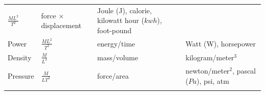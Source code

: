 \documentclass[
]{book}
\begin{document}
\begin{longtable}[]{@{}llll@{}}
\begin{minipage}[t]{0.17\columnwidth}
\(\frac{ML^2}{T^2}\)\strut
\end{minipage} & \begin{minipage}[t]{0.23\columnwidth}\raggedright
force \(\times\) displacement\strut
\end{minipage} & \begin{minipage}[t]{0.28\columnwidth}\raggedright
Joule (J), calorie, kilowatt hour (\(kwh\)), foot-pound\strut
\end{minipage}\tabularnewline
\begin{minipage}[t]{0.21\columnwidth}\raggedright
Power\strut
\end{minipage} & \begin{minipage}[t]{0.17\columnwidth}\raggedright
\(\frac{ML^2}{T^3}\)\strut
\end{minipage} & \begin{minipage}[t]{0.23\columnwidth}\raggedright
energy/time\strut
\end{minipage} & \begin{minipage}[t]{0.28\columnwidth}\raggedright
Watt (W), horsepower\strut
\end{minipage}\tabularnewline
\begin{minipage}[t]{0.21\columnwidth}\raggedright
Density\strut
\end{minipage} & \begin{minipage}[t]{0.17\columnwidth}\raggedright
\(\frac{M}{L^3}\)\strut
\end{minipage} & \begin{minipage}[t]{0.23\columnwidth}\raggedright
mass/volume\strut
\end{minipage} & \begin{minipage}[t]{0.28\columnwidth}\raggedright
kilogram/meter\(^3\)\strut
\end{minipage}\tabularnewline
\begin{minipage}[t]{0.21\columnwidth}\raggedright
Pressure\strut
\end{minipage} & \begin{minipage}[t]{0.17\columnwidth}\raggedright
\(\frac{M}{LT^2}\)\strut
\end{minipage} & \begin{minipage}[t]{0.23\columnwidth}\raggedright
force/area\strut
\end{minipage} & \begin{minipage}[t]{0.28\columnwidth}\raggedright
newton/meter\(^2\), pascal (\(Pa\)), psi, atm\strut
\end{minipage}\tabularnewline
\begin{minipage}[t]{0.21\columnwidth}\raggedright

\end{minipage}
\end{longtable}
\end{document}
